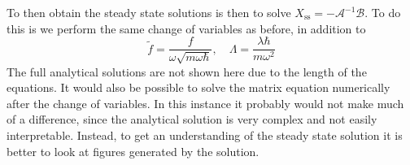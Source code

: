 To then obtain the steady state solutions is then to solve $X_\text{ss} = - \mathcal{A}^{-1} \mathcal{B}$. To do this is we perform the same change of variables as before, in addition to
\begin{equation}
    \tilde{f} = \frac{f}{\omega \sqrt{m \omega \hbar}} , \quad \Lambda = \frac{\lambda \hbar}{m \omega^2}
\end{equation}
The full analytical solutions are not shown here due to the length of the equations. It would also be possible to solve the matrix equation numerically after the change of variables. In this instance it probably would not make much of a difference, since the analytical solution is very complex and not easily interpretable. Instead, to get an understanding of the steady state solution it is better to look at figures generated by the solution.

